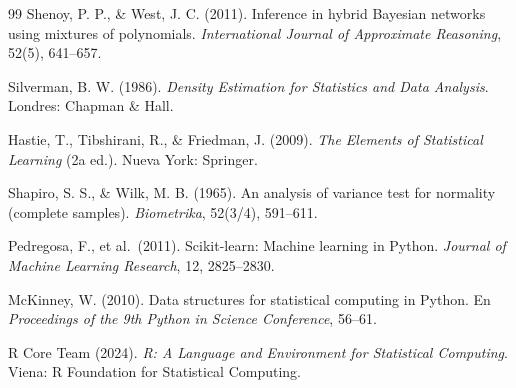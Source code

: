 \documentclass[11pt, a4paper]{article}
\begin{document}
\begin{thebibliography}{99}
 Shenoy, P. P., \& West, J. C. (2011). Inference in hybrid Bayesian networks
using mixtures of polynomials. \textit{International Journal of Approximate Reasoning}, 52(5),
641--657.

 Silverman, B. W. (1986). \textit{Density Estimation for Statistics and
Data Analysis}. Londres: Chapman \& Hall.

 Hastie, T., Tibshirani, R., \& Friedman, J. (2009). \textit{The Elements of
Statistical Learning} (2a ed.). Nueva York: Springer.

 Shapiro, S. S., \& Wilk, M. B. (1965). An analysis of variance test for
normality (complete samples). \textit{Biometrika}, 52(3/4), 591--611.

 Pedregosa, F., et al.\ (2011). Scikit-learn: Machine learning in Python.
\textit{Journal of Machine Learning Research}, 12, 2825--2830.

 McKinney, W. (2010). Data structures for statistical computing in Python.
En \textit{Proceedings of the 9th Python in Science Conference}, 56--61.

 R Core Team (2024). \textit{R: A Language and Environment for Statistical
Computing}. Viena: R Foundation for Statistical Computing.

\end{thebibliography}
\end{document}
